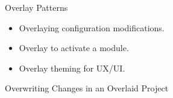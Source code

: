 \documentclass[xcolor=dvipsnames,14pt]{beamer}
\begin{document}
\begin{frame}{Overlay Patterns}
  \begin{itemize}
    \item Overlaying configuration modifications.
    \item Overlay to activate a module.
    \item Overlay theming for UX/UI.
  \end{itemize}
\end{frame}

\begin{frame}{Overwriting Changes in an Overlaid Project}
\end{frame}
\end{document}
